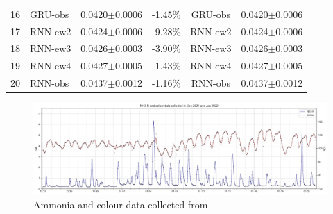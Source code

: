 \begin{table}[!ht]
\begin{NiceTabular}{clcccc}
      16 & GRU-obs  & 0.0420$\pm$0.0006 & -1.45\% &GRU-obs  & 0.0420$\pm$0.0006 \\
      17 & RNN-ew2  & 0.0424$\pm$0.0006 & -9.28\% &RNN-ew2  & 0.0424$\pm$0.0006 \\
      18 & RNN-ew3  & 0.0426$\pm$0.0003 & -3.90\% &RNN-ew3  & 0.0426$\pm$0.0003 \\
      19 & RNN-ew4  & 0.0427$\pm$0.0005 & -1.43\% &RNN-ew4  & 0.0427$\pm$0.0005 \\
      20 & RNN-obs  & 0.0437$\pm$0.0012 & -1.16\% &RNN-obs  & 0.0437$\pm$0.0012 \\
      \bottomrule
  \end{NiceTabular}
\end{table}

\begin{figure}[h]
  \centering
  \includegraphics[width=1.0\columnwidth]{imgs/results/data.png}
  \caption{Ammonia and colour data collected from }
  \label{fig:nh3-color-data}
\end{figure}

